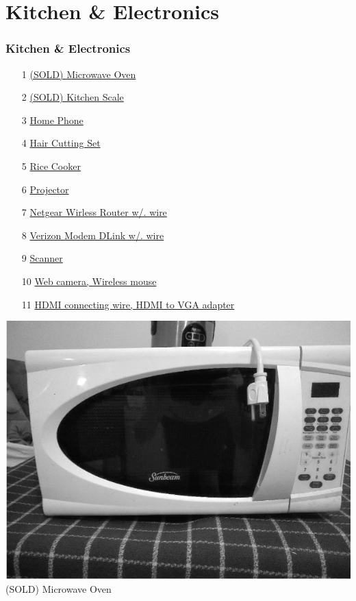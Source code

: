 \documentclass[t]{beamer}
\newcommand{\hlink}[2]{\hyperlink{#1}{#2}}
\newcommand{\htarget}[2]{\hypertarget{#1}{#2}}
\begin{document}
\section{Kitchen \& Electronics}
\begin{frame}[allowframebreaks]
\frametitle{Kitchen \& Electronics}
\begin{enumerate}
\item[1] \hlink{oven}{(SOLD) Microwave Oven}
\item[2] \hlink{scale}{(SOLD) Kitchen Scale}
\item[3] \hlink{phone}{Home Phone}
\item[4] \hlink{hair}{Hair Cutting Set}
\item[5] \hlink{rice}{Rice Cooker}
\item[6] \hlink{projector}{Projector}
\item[7] \hlink{netgear}{Netgear Wirless Router w/. wire}
\item[8] \hlink{verizon}{Verizon Modem DLink w/. wire}
\item[9] \hlink{scanner}{Scanner}
\item[10] \hlink{webcam}{Web camera, Wireless mouse}
\item[11] \hlink{hdmi}{HDMI connecting wire, HDMI to VGA adapter}
\end{enumerate}
\end{frame}
\begin{frame}\htarget{oven}{} \begin{center}
\includegraphics[height=0.8\textheight]{microwave_oven_sold.jpg} \\
(SOLD) Microwave Oven
\end{center} \end{frame}
\end{document}
